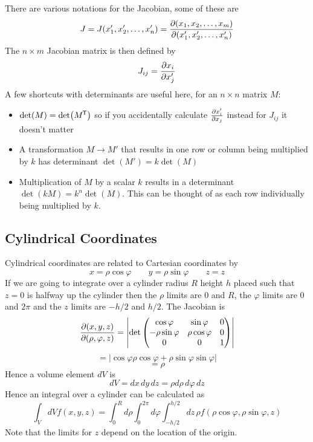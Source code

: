 \documentclass{article}
\begin{document}
    There are various notations for the Jacobian, some of these are
    \[J = J(x_1', x_2', \dotsc, x_n') = \pdv{(x_1, x_2, \dotsc, x_m)}{(x_1', x_2', \dotsc, x_n')}\]
    The \(n\times m\) Jacobian matrix is then defined by
    \[J_{ij} = \pdv{x_i}{x_j'}\]
    A few shortcuts with determinants are useful here, for an \(n\times n\) matrix \(M\):
    \begin{itemize}
        \item \(\det(M) = \det(M^{\mkern-1.5mu\mathsf{T}})\) so if you accidentally calculate \(\pdv{x_i'}{x_j}\) instead for \(J_{ij}\) it doesn't matter
        \item A transformation \(M\to M'\) that results in one row or column being multiplied by \(k\) has determinant \(\det(M') = k\det(M)\)
        \item Multiplication of \(M\) by a scalar \(k\) results in a determinant \(\det(kM) = k^n\det(M)\).
        This can be thought of as each row individually being multiplied by \(k\).
    \end{itemize}
    
    \subsection{Cylindrical Coordinates}
    Cylindrical coordinates are related to Cartesian coordinates by
    \[x = \rho\cos\varphi \qquad y = \rho\sin\varphi \qquad z = z\]
    If we are going to integrate over a cylinder radius \(R\) height \(h\) placed such that \(z = 0\) is halfway up the cylinder then the \(\rho\) limits are 0 and \(R\), the \(\varphi\) limits are 0 and \(2\pi\) and the \(z\) limits are \(-h/2\) and \(h/2\).
    The Jacobian is
    \[
        \pdv{(x, y, z)}{(\rho, \varphi, z)} = \left | \det
        \begin{pmatrix}
            \cos\varphi & \sin\varphi & 0 \\
            -\rho\sin\varphi & \rho\cos\varphi & 0\\
            0 & 0 & 1
        \end{pmatrix}
        \right |
    \]
    \[= |\cos\varphi\rho\cos\varphi + \rho\sin\varphi\sin\varphi|\]
    \[= \rho\]
    Hence a volume element \(dV\) is
    \[dV = dx\,dy\,dz = \rho d\rho\,d\varphi\, dz\]
    Hence an integral over a cylinder can be calculated as
    \[\int_V dV f(x, y, z) = \int_0^R d\rho \int_0^{2\pi} d\varphi \int_{-h/2}^{h/2}dz\, \rho f(\rho\cos\varphi, \rho\sin\varphi, z)\]
    Note that the limits for \(z\) depend on the location of the origin.
    
\end{document}
